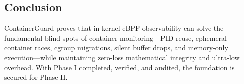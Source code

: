 \documentclass[11pt,a4paper]{article}
\begin{document}
\subsection{Conclusion}
ContainerGuard proves that in-kernel eBPF observability can solve the fundamental blind spots of container monitoring---PID reuse, ephemeral container races, cgroup migrations, silent buffer drops, and memory-only execution---while maintaining zero-loss mathematical integrity and ultra-low overhead. With Phase I completed, verified, and audited, the foundation is secured for Phase II.
\end{document}
